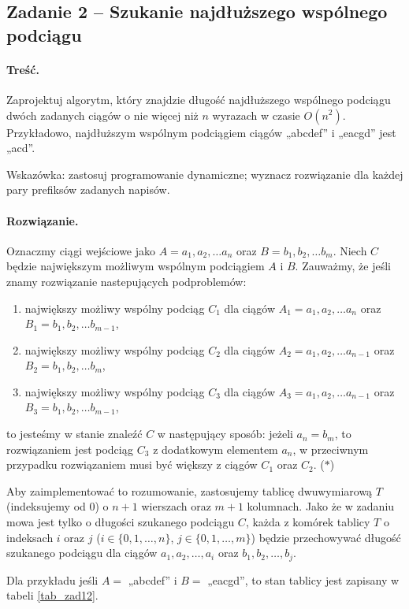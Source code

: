 \subsection{Zadanie 2 -- Szukanie najdłuższego wspólnego podciągu}
\paragraph{Treść.} Zaprojektuj algorytm, który znajdzie długość najdłuższego wspólnego podciągu dwóch zadanych ciągów
o nie więcej niż $n$ wyrazach w czasie $O(n^2)$. Przykładowo, najdłuższym wspólnym podciągiem 
ciągów „abcdef” i „eacgd” jest „acd”.

Wskazówka: zastosuj programowanie dynamiczne; wyznacz rozwiązanie dla każdej pary prefiksów zadanych napisów.

\paragraph{Rozwiązanie.}
Oznaczmy ciągi wejściowe jako 
$A = a_1, a_2, \dots a_n$ oraz 
$B = b_1, b_2, \dots b_m$. Niech $C$ będzie największym możliwym
wspólnym podciągiem $A$ i $B$.  Zauważmy, że jeśli znamy rozwiązanie
nastepujących podproblemów:
\begin{enumerate}
	\item największy możliwy wspólny podciąg $C_1$ dla ciągów $A_1=a_1, a_2, \dots a_n$ oraz 
	$B_1=b_1, b_2, \dots b_{m-1}$,
	\item największy możliwy wspólny podciąg $C_2$ dla ciągów $A_2 =a_1, a_2, \dots a_{n-1}$ oraz 
	$B_2=b_1, b_2, \dots b_{m}$,
	\item największy możliwy wspólny podciąg $C_3$ dla ciągów $A_3=a_1, a_2, \dots a_{n-1}$ oraz 
	$B_3=b_1, b_2, \dots b_{m-1}$,
\end{enumerate}
to jesteśmy w stanie znaleźć $C$
w następujący sposób: jeżeli $a_n = b_m$, to rozwiązaniem 
jest podciąg $C_3$ z dodatkowym elementem $a_n$, w przeciwnym przypadku
rozwiązaniem musi być większy z ciągów $C_1$ oraz $C_2$. ($\ast$) 

Aby zaimplementować to rozumowanie, zastosujemy tablicę dwuwymiarową $T$ 
(indeksujemy od 0)
o $n+1$ wierszach oraz $m+1$ kolumnach. Jako że w zadaniu mowa jest 
tylko o długości szukanego podciągu $C$, każda z komórek tablicy $T$ 
o indeksach $i$ oraz $j$ ($i \in \{0,1, \dots, n\}$, 
$j \in \{0,1, \dots, m\}$) będzie 
przechowywać długość szukanego podciągu dla ciągów 
$a_1, a_2, \dots, a_i$ oraz $b_1, b_2, \dots, b_j$. 

Dla przykładu 
jeśli $A = $ „abcdef” i  $B = $ „eacgd”, to stan tablicy jest zapisany w tabeli \ref{tab_zad12}.


